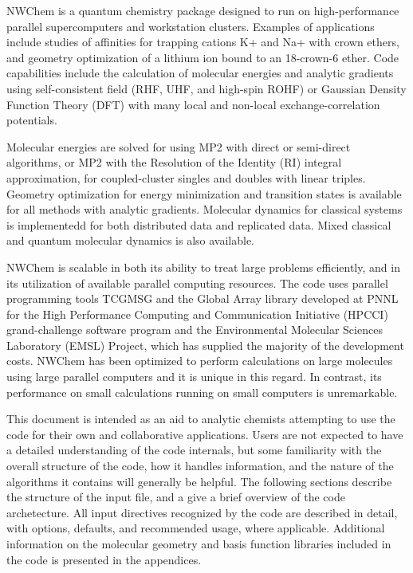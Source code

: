 

NWChem is a quantum chemistry package
designed to run on high-performance parallel supercomputers and
workstation clusters.  Examples of applications include studies 
of affinities for trapping cations K+ and Na+ with crown ethers, and
geometry optimization of a lithium ion bound to an 18-crown-6 ether.
Code capabilities include the calculation of molecular energies and
analytic gradients using self-consistent field (RHF, UHF, and high-spin
ROHF) or Gaussian Density Function Theory (DFT) with many local and
non-local exchange-correlation potentials.

Molecular energies are solved for using MP2 with direct or
semi-direct algorithms, or MP2 with the Resolution of the Identity (RI)
integral approximation, for coupled-cluster singles and doubles
with linear triples.  Geometry optimization for energy minimization
and transition states is available for all methods with analytic
gradients.  Molecular dynamics for classical systems is implementedd
for both distributed data and replicated data.  Mixed classical
and quantum molecular dynamics is also available.

NWChem is scalable in both its ability to
treat large problems efficiently, and in its utilization of available
parallel computing resources.  The code uses parallel programming
tools TCGMSG and the Global Array library developed at PNNL
for the High Performance Computing and
Communication Initiative (HPCCI) grand-challenge software program and
the Environmental Molecular Sciences Laboratory (EMSL) Project, which
has supplied the majority of the development costs.
NWChem has been optimized to perform calculations on large molecules
using large parallel computers and it is unique in this regard.  In
contrast, its performance on small calculations running on
small computers is unremarkable.

This document is intended as an aid to analytic chemists attempting
to use the code for their own and collaborative applications.  Users
are not expected to have a detailed understanding of the code internals,
but some familiarity with the overall structure of the code, how
it handles information, and the nature of the algorithms it contains
will generally be helpful.  The following sections describe the 
structure of the input file, and a give a brief overview of the
code archetecture.  All input directives recognized by the code are
described in detail, with options, defaults, and recommended usage,
where applicable.  Additional information on the molecular geometry
and basis function libraries included in the code is presented
in the appendices.

